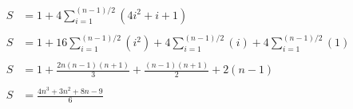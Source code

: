 \documentclass{minimal}
\begin{document}
\begin{align*}
S &= 1 + 4\sum_{i=1}^{(n-1)/2}(4i^2 +i + 1) \\
\\
S &= 1 + 16\sum_{i=1}^{(n-1)/2}(i^2) + 4\sum_{i=1}^{(n-1)/2}(i) + 4\sum_{i=1}^{(n-1)/2}(1) \\
\\
S &= 1 + \frac{2n(n-1)(n+1)}{3} + \frac{(n-1)(n+1)}{2} + 2(n-1) \\
\\
S &= \frac{4n^3+3n^2+8n-9}{6}
\end{align*}
\end{document}
